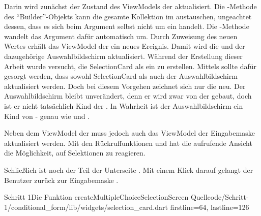 Darin wird zunächst der Zustand des ViewModels der  aktualisiert.
Die -Methode des \enquote{Builder}-Objekts kann die gesamte Kollektion im  austauschen, ungeachtet dessen, dass es sich beim Argument selbst nicht um ein  handelt.
Die -Methode wandelt das Argument dafür automatisch um.
Durch Zuweisung des neuen Wertes erhält das ViewModel der  ein neues Ereignis.
Damit wird die  und der dazugehörige Auswahlbildschirm aktualisiert.
Während der Erstellung dieser Arbeit wurde versucht, die SelectionCard als ein  zu erstellen.
Mittels  sollte dafür gesorgt werden, dass sowohl SelectionCard als auch der Auswahlbildschirm aktualisiert werden.
Doch bei diesem Vorgehen zeichnet sich nur die  neu.
Der Auswahlbildschirm bleibt unverändert, denn er wird zwar von der  gebaut, doch ist er nicht tatsächlich Kind der .
In Wahrheit ist der Auswahlbildschirm ein Kind von  - genau wie  und .

Neben dem ViewModel der  muss jedoch auch das ViewModel der Eingabemaske aktualisiert werden.
Mit den Rückruffunktionen   und   hat die aufrufende Ansicht die Möglichkeit, auf Selektionen zu reagieren.

Schließlich ist noch der  Teil der Unterseite .
Mit einem Klick darauf gelangt der Benutzer zurück zur Eingabemaske .


\begin{alexlisting}{Schritt 1}{Die Funktion createMultipleChoiceSelectionScreen}
  {Quellcode/Schritt-1/conditional_form/lib/widgets/selection_card.dart}
  {firstline=64, lastline=126}
  \label{lst:Schritt1FunktionCreateMultipleChoiceSelectionScreen}
\end{alexlisting}
 
 
\ifIncludeFigures \clearpage \fi
